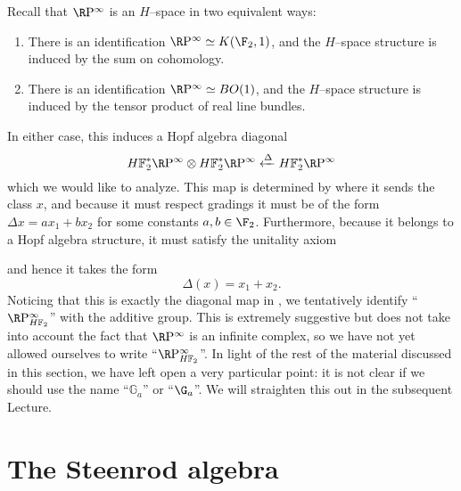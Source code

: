 \begin{example}\label{RPExampleFaulty}
Recall that \(\RP^\infty\) is an \(H\)--space in two equivalent ways:
\begin{enumerate}
\item There is an identification \(\RP^\infty \simeq K(\F_2, 1)\), and the \(H\)--space structure is induced by the sum on cohomology.
\item There is an identification \(\RP^\infty \simeq BO(1)\), and the \(H\)--space structure is induced by the tensor product of real line bundles.
\end{enumerate}
In either case, this induces a Hopf algebra diagonal \[\HFtwo^* \RP^\infty \otimes \HFtwo^* \RP^\infty \xleftarrow\Delta \HFtwo^* \RP^\infty\] which we would like to analyze.  This map is determined by where it sends the class \(x\), and because it must respect gradings it must be of the form \(\Delta x = ax_1 + bx_2\) for some constants \(a, b \in \F_2\).  Furthermore, because it belongs to a Hopf algebra structure, it must satisfy the unitality axiom
\begin{center}
\end{center}
and hence it takes the form \[\Delta(x) = x_1 + x_2.\]  Noticing that this is exactly the diagonal map in , we tentatively identify ``\(\RP^\infty_{\HFtwo}\)'' with the additive group.  This is extremely suggestive but does not take into account the fact that \(\RP^\infty\) is an infinite complex, so we have not yet allowed ourselves to write ``\(\RP^\infty_{\HFtwo}\)''.  In light of the rest of the material discussed in this section, we have left open a very particular point: it is not clear if we should use the name ``\(\mathbb G_a\)'' or ``\(\G_a\)''.  We will straighten this out in the subsequent Lecture.
\end{example}








\section{The Steenrod algebra}\label{TheSteenrodAlgebraSection}

